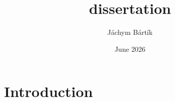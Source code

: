 \documentclass{article}
\title{dissertation}
\author{Jáchym Bártík}
\date{June 2026}
\begin{document}
\maketitle

\section{Introduction}
\end{document}
